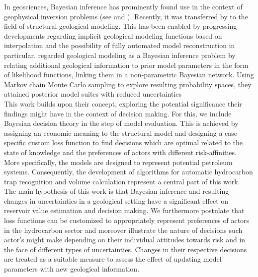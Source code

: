 In geosciences, Bayesian inference has prominently found use in the context of geophysical inversion problems (see \citet{tarantola1982inverse, mosegaard2002probabilistic} and \citet{sambridge2002monte}). Recently, it was transferred by \citet{delaVarga2016} to the field of structural geological modeling. This has been enabled by progressing developments regarding implicit geological modeling functions based on interpolation \citep{hillier2014three, mallet1992discrete, lajaunie1997foliation} and the possibility of fully automated model reconstruction in particular. \citet{delaVarga2016} regarded geological modeling as a Bayesian inference problem by relating additional geological information to prior model parameters in the form of likelihood functions, linking them in a non-parametric Bayesian network. Using Markov chain Monte Carlo sampling to explore resulting probability spaces, they attained posterior model suites with reduced uncertainties \citep{delaVarga2016}\\
This work builds upon their concept, exploring the potential significance their findings might have in the context of decision making. For this, we include Bayesian decision theory in the step of model evaluation. This is achieved by assigning an economic meaning to the structural model and designing a case-specific custom loss function to find decisions which are optimal related to the state of knowledge and the preferences of actors with different risk-affinities. More specifically, the models are designed to represent potential petroleum systems. Consequently, the development of algorithms for automatic hydrocarbon trap recognition and volume calculation represent a central part of this work.\\
The main hypothesis of this work is that Bayesian inference and resulting changes in uncertainties in a geological setting have a significant effect on reservoir value estimation and decision making. We furthermore postulate that loss functions can be customized to appropriately represent preferences of actors in the hydrocarbon sector and moreover illustrate the nature of decisions such actor's might make depending on their individual attitudes towards risk and in the face of different types of uncertainties. Changes in their respective decisions are treated as a suitable measure to assess the effect of updating model parameters with new geological information.